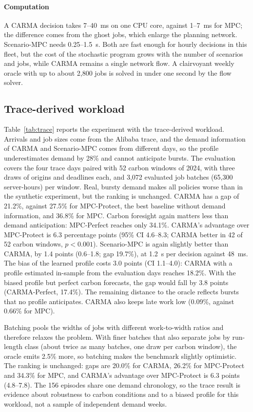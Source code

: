 \paragraph{Computation} A CARMA decision takes 7--40~ms on one CPU core, against 1--7~ms for MPC; the difference comes from the ghost jobs, which enlarge the planning network. Scenario-MPC needs 0.25--1.5~s. Both are fast enough for hourly decisions in this fleet, but the cost of the stochastic program grows with the number of scenarios and jobs, while CARMA remains a single network flow. A clairvoyant weekly oracle with up to about 2{,}800 jobs is solved in under one second by the flow solver.

\FloatBarrier
\subsection{Trace-derived workload}\label{sec:res_trace}

Table~\ref{tab:trace} reports the experiment with the trace-derived workload. Arrivals and job sizes come from the Alibaba trace, and the demand information of CARMA and Scenario-MPC comes from different days, so the profile underestimates demand by 28\% and cannot anticipate bursts. The evaluation covers the four trace days paired with 52 carbon windows of 2024, with three draws of origins and deadlines each, and 3{,}072 evaluated job batches (65{,}300 server-hours) per window. Real, bursty demand makes all policies worse than in the synthetic experiment, but the ranking is unchanged. CARMA has a gap of 21.2\%, against 27.5\% for MPC-Protect, the best baseline without demand information, and 36.8\% for MPC. Carbon foresight again matters less than demand anticipation: MPC-Perfect reaches only 34.1\%. CARMA's advantage over MPC-Protect is 6.3 percentage points (95\% CI 4.6--8.3; CARMA better in 42 of 52 carbon windows, $p<0.001$). Scenario-MPC is again slightly better than CARMA, by 1.4 points (0.6--1.8; gap 19.7\%), at 1.2~s per decision against 48~ms. The bias of the learned profile costs 3.0 points (CI 1.1--4.0): CARMA with a profile estimated in-sample from the evaluation days reaches 18.2\%. With the biased profile but perfect carbon forecasts, the gap would fall by 3.8 points (CARMA-Perfect, 17.4\%). The remaining distance to the oracle reflects bursts that no profile anticipates. CARMA also keeps late work low (0.09\%, against 0.66\% for MPC).

Batching pools the widths of jobs with different work-to-width ratios and therefore relaxes the problem. With finer batches that also separate jobs by run-length class (about twice as many batches, one draw per carbon window), the oracle emits 2.5\% more, so batching makes the benchmark slightly optimistic. The ranking is unchanged: gaps are 20.0\% for CARMA, 26.2\% for MPC-Protect and 34.3\% for MPC, and CARMA's advantage over MPC-Protect is 6.3 points (4.8--7.8). The 156 episodes share one demand chronology, so the trace result is evidence about robustness to carbon conditions and to a biased profile for this workload, not a sample of independent demand weeks.

